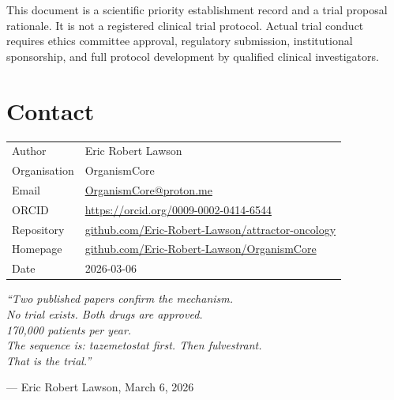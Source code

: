\documentclass[12pt, a4paper]{article}
\begin{document}
This document is a scientific priority establishment
record and a trial proposal rationale. It is not a
registered clinical trial protocol. Actual trial
conduct requires ethics committee approval, regulatory
submission, institutional sponsorship, and full
protocol development by qualified clinical investigators.

\section*{Contact}

\begin{tabular}{ll}
Author        & Eric Robert Lawson \\
Organisation  & OrganismCore \\
Email         &
  \href{mailto:OrganismCore@proton.me}
       {OrganismCore@proton.me} \\
ORCID         &
  \href{https://orcid.org/0009-0002-0414-6544}
       {https://orcid.org/0009-0002-0414-6544} \\
Repository    &
  \href{https://github.com/Eric-Robert-Lawson/attractor-oncology}
       {github.com/Eric-Robert-Lawson/attractor-oncology} \\
Homepage      &
  \href{https://github.com/Eric-Robert-Lawson/OrganismCore}
       {github.com/Eric-Robert-Lawson/OrganismCore} \\
Date          & 2026-03-06 \\
\end{tabular}

\vspace{2em}

\begin{center}
\textit{``Two published papers confirm the mechanism.\\
No trial exists. Both drugs are approved.\\
170,000 patients per year.\\
The sequence is: tazemetostat first.
Then fulvestrant.\\
That is the trial.''}

\medskip
--- Eric Robert Lawson, March 6, 2026
\end{center}

\end{document}
